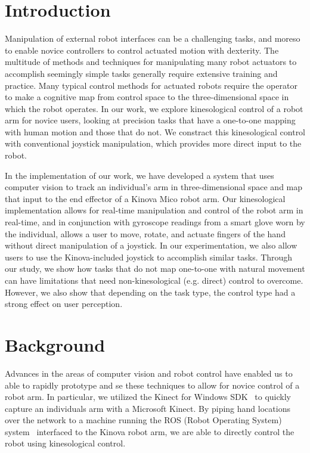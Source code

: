 \documentclass{sigchi}
\begin{document}


\section{Introduction}

Manipulation of external robot interfaces can be a challenging tasks, and moreso to enable novice controllers to control actuated motion with dexterity.  The multitude of methods and techniques for manipulating many robot actuators to accomplish seemingly simple tasks generally require extensive training and practice.  Many typical control methods for actuated robots require the operator to make a cognitive map from control space to the three-dimensional space in which the robot operates.  In our work, we explore kinesological control of a robot arm for novice users, looking at precision tasks that have a one-to-one mapping with human motion and those that do not.  We constract this kinesological control with conventional joystick manipulation, which provides more direct input to the robot.  

In the implementation of our work, we have developed a system that uses computer vision to track an individual's arm in three-dimensional space and map that input to the end effector of a Kinova Mico robot arm.  Our kinesological implementation allows for real-time manipulation and control of the robot arm in real-time, and in conjunction with gyroscope readings from a smart glove worn by the individual, allows a user to move, rotate, and actuate fingers of the hand without direct manipulation of a joystick. In our experimentation, we also allow users to use the Kinova-included joystick to accomplish similar tasks. Through our study, we show how tasks that do not map one-to-one with natural movement can have limitations that need non-kinesological (e.g. direct) control to overcome.  However, we also show that depending on the task type, the control type had a strong effect on user perception.


\section{Background}

Advances in the areas of computer vision and robot control have enabled us to able to rapidly prototype and se these techniques to allow for novice control of a robot arm.  In particular, we utilized the Kinect for Windows SDK~\cite{Kinect} to quickly capture an individuals arm with a Microsoft Kinect.  By piping hand locations over the network to a machine running the ROS (Robot Operating System) system~\cite{ROS} interfaced to the Kinova robot arm, we are able to directly control the robot using kinesological control.
\end{document}
